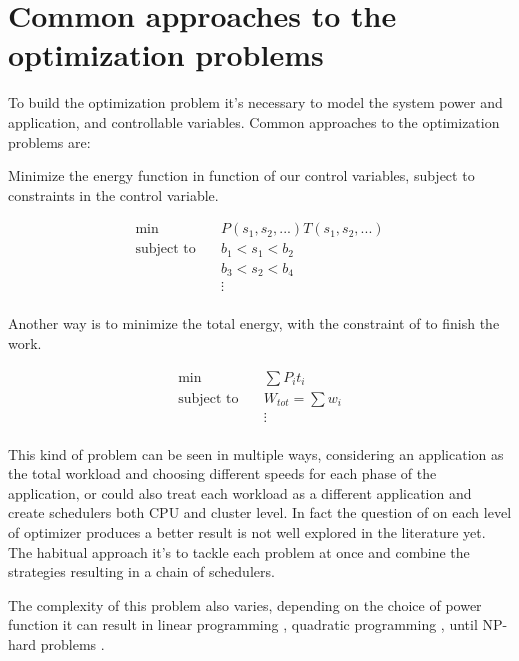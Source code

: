 \section{Common approaches to the optimization problems}

To build the optimization problem it's necessary to model the system power and application, and controllable variables. Common approaches to the optimization problems are:

Minimize the energy function in function of our control variables, subject to constraints in the control variable.

\begin{equation}
\begin{aligned}
\textrm{min} \quad & P(s_1, s_2, ...)T(s_1,s_2,...)\\
\textrm{subject to} \quad & b_1<s_1<b_2\\
\quad & b_3<s_2<b_4\\
\quad & \vdots\\
\end{aligned}
\end{equation}

Another way is to minimize the total energy, with the constraint of to finish the work.

\begin{equation}
\begin{aligned}
\textrm{min} \quad & \sum{P_it_i}\\
\textrm{subject to} \quad & W_{tot} = \sum w_i\\
\quad & \vdots\\
\end{aligned}
\end{equation}

This kind of problem can be seen in multiple ways, considering an application as the total workload and choosing different speeds for each phase of the application, or could also treat each workload as a different application and create schedulers both CPU and cluster level. In fact the question of on each level of optimizer produces a better result is not well explored in the literature yet. The habitual approach it's to tackle each problem at once and combine the strategies resulting in a chain of schedulers.

The complexity of this problem also varies, depending on the choice of power function it can result in linear programming \cite{Kim2015RacingHeuristics}, quadratic programming \cite{Horyath2008Multi-modeClusters}, until NP-hard problems \cite{Fu2018RaceMinimization}.

